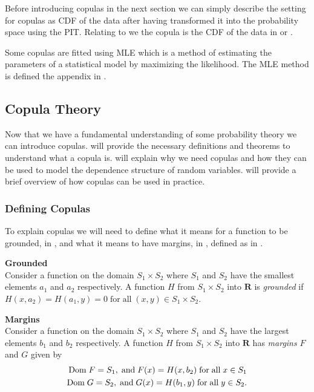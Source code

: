 Before introducing copulas in the next section we can simply describe the setting for copulas as \gls{CDF} of the data after having transformed it into the probability space using the \gls{PIT}. Relating to  we the copula is the \gls{CDF} of the data in  or .

Some copulas are fitted using \gls{MLE} which is a method of estimating the parameters of a statistical model by maximizing the likelihood. The \gls{MLE} method is defined the appendix in .


\subsection{Copula Theory}\label{sec:CopulaTheory}
Now that we have a fundamental understanding of some probability theory we can introduce copulas.  will provide the necessary definitions and theorems to understand what a copula is.  will explain why we need copulas and how they can be used to model the dependence structure of random variables.  will provide a brief overview of how copulas can be used in practice.

\subsubsection{Defining Copulas}\label{sec:DefiningCopulas}
To explain copulas we will need to define what it means for a function to be grounded, in , and what it means to have margins, in , defined as in .

\begin{definition}\label{def:grounded}\textbf{Grounded} \\
    Consider a function on the domain $S_1\times S_2$ where $S_1$ and $S_2$ have the smallest elements $a_1$ and $a_2$ respectively. A function $H$ from $S_1\times S_2$ into $\mathbf{R}$ is \emph{grounded} if $H(x,a_2)= H(a_1,y) = 0 \;\mathrm{for \;all\;} (x,y) \in S_1\times S_2.$
\end{definition}

\begin{definition}\label{def:margins}
    \textbf{Margins}\\
    Consider a function on the domain $S_1\times S_2$ where $S_1$ and $S_2$ have the largest elements $b_1$ and $b_2$ respectively. A function $H$ from $S_1\times S_2$ into $\mathbf{R}$ has \emph{margins} $F$ and $G$ given by
    \begin{align*}
        \mathrm{Dom \;} F = S_1, \;\mathrm{and }\; F(x) = H(x,b_2) \;\mathrm{for \;all\;} x \in S_1\\
        \mathrm{Dom \;} G = S_2, \;\mathrm{and }\; G(x) = H(b_1,y) \;\mathrm{for \;all\;} y \in S_2.
    \end{align*}
\end{definition}

